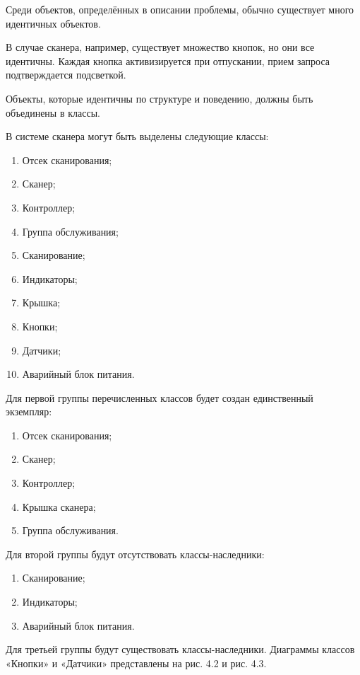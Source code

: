 \documentclass[12pt]{article}
\begin{document}
    Среди объектов, определённых в описании проблемы, обычно существует много идентичных объектов.

    В случае сканера, например, существует множество кнопок, но они все идентичны. Каждая кнопка активизируется при отпускании, прием запроса подтверждается подсветкой.

    Объекты, которые идентичны по структуре и поведению, должны быть объединены в классы.

    В системе сканера могут быть выделены следующие классы:

    \begin{enumerate}
        \item Отсек сканирования;
        \item Сканер;
        \item Контроллер;
        \item Группа обслуживания;
        \item Сканирование;
        \item Индикаторы;
        \item Крышка;
        \item Кнопки;
        \item Датчики;
        \item Аварийный блок питания.
    \end{enumerate}

    Для первой группы перечисленных классов будет создан единственный экземпляр:

    \begin{enumerate}
        \item Отсек сканирования;
        \item Сканер;
        \item Контроллер;
        \item Крышка сканера;
        \item Группа обслуживания.
    \end{enumerate}

    Для второй группы будут отсутствовать классы-наследники:

    \begin{enumerate}
        \item Сканирование;
        \item Индикаторы;
        \item Аварийный блок питания.
    \end{enumerate}

    \newpage

    Для третьей группы будут существовать классы-наследники. Диаграммы классов «Кнопки» и «Датчики» представлены на рис. 4.2 и рис. 4.3.
\end{document}
